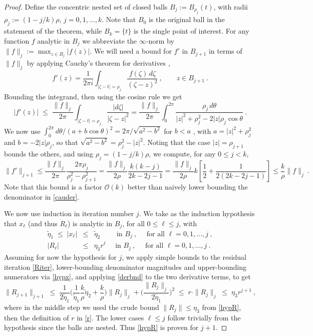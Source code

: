 \documentclass[10pt]{article}
\newcommand{\be}{\begin{equation}}
\newcommand{\ee}{\end{equation}}
\newcommand{\bea}{\begin{eqnarray}}
\newcommand{\eea}{\end{eqnarray}}
\newcommand{\bigO}{{\mathcal O}}
\newcommand{\te}{\tilde\eta}
\begin{document}
\begin{proof}
  Define the concentric nested set of closed balls $B_j := B_{\rho_j}(t)$,
  with radii $\rho_j := (1-j/k)\rho$, $j=0,1,\dots,k$. Note that
  $B_0$ is the original ball in the statement of the theorem, while
  $B_k = \{t\}$ is the single point of interest.
  For any function $f$ analytic in $B_j$ we abbreviate the $\infty$-norm by
  $\|f\|_j := \max_{z \in B_j}|f(z)|$.
  We will need a bound for $f'$ in $B_{j+1}$ in terms of $\|f\|_j$ by
  applying Cauchy's theorem for derivatives
  \cite{steinshakarchi},
  \be
  f'(z) = \frac{1}{2\pi i} \int_{|\zeta-t|=\rho_j} \frac{f(\zeta)\, d\zeta}{(\zeta-z)^2}
  ~, \qquad z \in B_{j+1}~.
  \label{cauder}
  \ee
  Bounding the integrand, then using the cosine rule we get
  $$
  |f'(z)| \;\le \;
  \frac{\|f\|_j}{2\pi} \int_{|\zeta-t| = \rho_j} \frac{|d\zeta|}{|\zeta-z|^2}
  =
  \frac{\|f\|_j}{2\pi} \int_0^{2\pi} \frac{\rho_j\, d\theta}{|z|^2 + \rho_j^2 - 2|z|\rho_j \cos \theta}~.
  $$
  We now use $\int_{0}^{2\pi} d\theta /(a + b \cos \theta)^2 = 2\pi/\sqrt{a^2-b^2}$
  for $b<a$ \cite[Eq.~3.613.1]{GR8}, with
  $a = |z|^2 + \rho_j^2$ and $b = -2|z|\rho_j$, so that
  $\sqrt{a^2-b^2} = \rho_j^2-|z|^2$.
  Noting that the case $|z| = \rho_{j+1}$ bounds the others,
  and using $\rho_j=(1-j/k)\rho$, we compute, for any $0\le j < k$,
  \be
  \|f'\|_{j+1} \le
  \frac{\|f\|_j}{2\pi} \frac{2\pi\rho_j}{\rho_j^2-\rho_{j+1}^2}
  =
  \frac{\|f\|_j}{2 \rho} \frac{k(k-j)}{2k-2j-1}
  =
  \frac{\|f\|_j}{2 \rho} k \left[ \frac{1}{2} + \frac{1}{2(2k-2j-1)}\right]
  \le
  \frac{k}{\rho}\|f\|_j~.
  \label{derbnd}
  \ee
  Note that this bound is a factor $\bigO(k)$ better than naively
  lower bounding the denominator in \eqref{cauder}.
  
  We now use induction in iteration number $j$.
  We take as the induction hypothesis that $x_\ell$ (and thus $R_\ell$)
  is analytic in $B_j$, for all $0\le \ell \le j$, with
  \bea
  \te_1 \;\le\; |x_\ell| &\le& \te_2
  \qquad \mbox{ in } B_j~, \quad \mbox{ for all } \ell = 0,1,\dots,j~,
  \label{hypx}
  \\
  |R_\ell| &\le& \eta_3 r^\ell \quad \mbox{ in } B_j~, \quad \mbox{ for all } \ell = 0,1,\dots,j~.
  \label{hypR}
  \eea
  Assuming for now the hypothesis for $j$, we apply simple bounds to the
  residual iteration \eqref{Riter},
  lower-bounding denominator magnitudes and upper-bounding numerators
  via \eqref{hypx},
  and applying \eqref{derbnd} to the two derivative terms, to get
  $$
  \|R_{j+1}\|_{j+1}
  \;\le\;
  \frac{1}{2\te_1}\biggl(
  \frac{1}{\te_1} \frac{k}{\rho}\te_2 + \frac{k}{\rho}
  \biggr)\|R_j\|_j
  +\biggl(\frac{\|R_j\|_j}{2\te_1}\biggr)^2
  \;\le\;
  r \cdot \|R_j\|_j
  \;\le\;
  \eta_3 r^{j+1}~,
  $$
where in the middle step we used the crude bound $\|R_j\| \le \eta_3$
from \eqref{hypR}, then the definition of $r$ in \eqref{r}.
The lower cases $\ell\le j$ follow trivially from the hypothesis since the balls
are nested.
Thus \eqref{hypR} is proven for $j+1$.


\end{proof}
\end{document}
